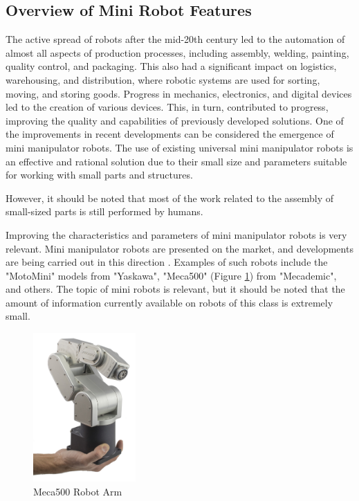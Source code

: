 \subsection{Overview of Mini Robot Features}

The active spread of robots after the mid-20th century led to the automation of almost all aspects of production processes, including assembly, welding, painting, quality control, and packaging. This also had a significant impact on logistics, warehousing, and distribution, where robotic systems are used for sorting, moving, and storing goods. Progress in mechanics, electronics, and digital devices led to the creation of various devices. This, in turn, contributed to progress, improving the quality and capabilities of previously developed solutions. One of the improvements in recent developments can be considered the emergence of mini manipulator robots.
The use of existing universal mini manipulator robots is an effective and rational solution due to their small size and parameters suitable for working with small parts and structures.

However, it should be noted that most of the work related to the assembly of small-sized parts is still performed by humans.

Improving the characteristics and parameters of mini manipulator robots is very relevant.
Mini manipulator robots are presented on the market, and developments are being carried out in this direction \citep{Li2022}. Examples of such robots include the "MotoMini" models from "Yaskawa", "Meca500" (Figure \ref{meca}) from "Mecademic", and others. The topic of mini robots is relevant, but it should be noted that the amount of information currently available on robots of this class is extremely small.

\begin{figure}[H]
	\centering
	\includegraphics[width=0.35\textwidth]{Src/images/Meca500.jpg}
	\caption{Meca500 Robot Arm}
	\label{meca}
\end{figure}

